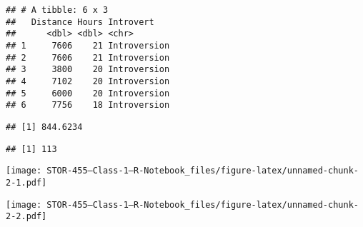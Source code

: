 \documentclass[
]{article}
\newenvironment{Shaded}{\begin{snugshade}}{\end{snugshade}}
\newcommand{\CommentTok}[1]{\textcolor[rgb]{0.56,0.35,0.01}{\textit{#1}}}
\newcommand{\DataTypeTok}[1]{\textcolor[rgb]{0.13,0.29,0.53}{#1}}
\newcommand{\KeywordTok}[1]{\textcolor[rgb]{0.13,0.29,0.53}{\textbf{#1}}}
\newcommand{\NormalTok}[1]{#1}
\newcommand{\OperatorTok}[1]{\textcolor[rgb]{0.81,0.36,0.00}{\textbf{#1}}}
\newcommand{\OtherTok}[1]{\textcolor[rgb]{0.56,0.35,0.01}{#1}}
\begin{document}
\begin{verbatim}
## # A tibble: 6 x 3
##   Distance Hours Introvert   
##      <dbl> <dbl> <chr>       
## 1     7606    21 Introversion
## 2     7606    21 Introversion
## 3     3800    20 Introversion
## 4     7102    20 Introversion
## 5     6000    20 Introversion
## 6     7756    18 Introversion
\end{verbatim}

\begin{Shaded}
\end{Shaded}

\begin{verbatim}
## [1] 844.6234
\end{verbatim}

\begin{Shaded}
\end{Shaded}

\begin{verbatim}
## [1] 113
\end{verbatim}

\begin{Shaded}
\end{Shaded}

\texttt{[image: STOR-455---Class-1---R-Notebook\_files/figure-latex/unnamed-chunk-2-1.pdf]}

\begin{Shaded}
\end{Shaded}

\texttt{[image: STOR-455---Class-1---R-Notebook\_files/figure-latex/unnamed-chunk-2-2.pdf]}
\end{document}
